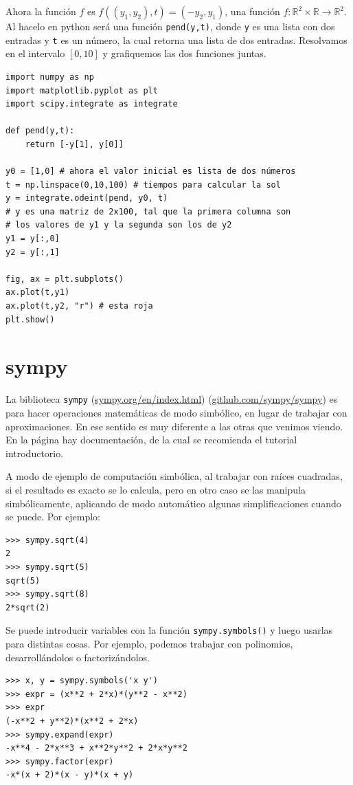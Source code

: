 \documentclass[a4paper, 12pt]{report}
\newcommand{\R}{\mathbb{R}}
\theoremstyle{definition}
\begin{document}
Ahora la función $f$ es  $f((y_1,y_2),t) = (-y_2,y_1)$, una función $f:\R^2\times\R\to \R^2$. Al hacelo en python será una función {\tt pend(y,t)}, donde {\tt y} es una lista con dos entradas y {\tt t} es un número, la cual retorna una lista de dos entradas.
Resolvamos en el intervalo $[0,10]$ y grafiquemos las dos funciones juntas.
\begin{verbatim}
import numpy as np
import matplotlib.pyplot as plt
import scipy.integrate as integrate

def pend(y,t): 
    return [-y[1], y[0]]

y0 = [1,0] # ahora el valor inicial es lista de dos números
t = np.linspace(0,10,100) # tiempos para calcular la sol
y = integrate.odeint(pend, y0, t)
# y es una matriz de 2x100, tal que la primera columna son
# los valores de y1 y la segunda son los de y2
y1 = y[:,0]
y2 = y[:,1]

fig, ax = plt.subplots()
ax.plot(t,y1)
ax.plot(t,y2, "r") # esta roja
plt.show()
\end{verbatim}

\section{sympy}

La biblioteca {\tt sympy} (\href{https://www.sympy.org/en/index.html}{sympy.org/en/index.html}) (\href{https://github.com/sympy/sympy}{github.com/sympy/sympy}) es para hacer operaciones matemáticas de modo simbólico, en lugar de trabajar con aproximaciones. En ese sentido es muy diferente a las otras que venimos viendo. En la página hay documentación, de la cual se recomienda el tutorial introductorio.

A modo de ejemplo de computación simbólica, al trabajar con raíces cuadradas, si el resultado es exacto se lo calcula, pero en otro caso se las manipula simbólicamente, aplicando de modo automático algunas simplificaciones cuando se puede. Por ejemplo:
\begin{verbatim}
>>> sympy.sqrt(4)
2
>>> sympy.sqrt(5)
sqrt(5)
>>> sympy.sqrt(8)
2*sqrt(2)
\end{verbatim}

Se puede introducir variables con la función {\tt sympy.symbols()} y luego usarlas para distintas cosas. Por ejemplo, podemos trabajar con polinomios, desarrollándolos o factorizándolos.
\begin{verbatim}
>>> x, y = sympy.symbols('x y')
>>> expr = (x**2 + 2*x)*(y**2 - x**2)
>>> expr
(-x**2 + y**2)*(x**2 + 2*x)
>>> sympy.expand(expr)
-x**4 - 2*x**3 + x**2*y**2 + 2*x*y**2
>>> sympy.factor(expr)
-x*(x + 2)*(x - y)*(x + y)
\end{verbatim}
\end{document}
